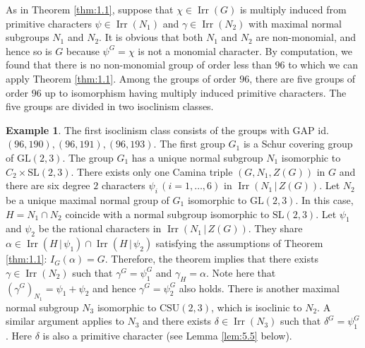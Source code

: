 \documentclass[a4paper,12pt]{article}
\theoremstyle{definition}
\newtheorem{example}[theorem]{Example}
\theoremstyle{remark}
\DeclareMathOperator{\irr}{Irr}
\numberwithin{equation}{section}
\begin{document}
As in Theorem \ref{thm:1.1}, suppose that $\chi \in \irr (G)$ is multiply induced 
from primitive characters  $\psi \in \irr (N_1)$ and $\gamma \in \irr (N_2)$ 
with maximal normal subgroups $N_1$ and $N_2$.
It is obvious that both $N_1$ and $N_2$ are non-monomial, and hence so is $G$
because $\psi^G = \chi $ is not a monomial character.
By computation, we found that there is no non-monomial group of order less than $96$ 
to which we can apply Theorem \ref{thm:1.1}.
Among the groups of order $96$,
there are five groups of order $96$ up to isomorphism having multiply induced 
    primitive characters. The five groups are divided in two isoclinism classes.

\begin{example} \label{ex:5.2}
     The first isoclinism class consists of the groups with GAP id. $(96,190),(96,191),
    (96,193)$. The first group $G_1$ is a Schur covering group of $\mathrm{GL}(2,3)$.
    The group $G_1$ has a unique normal subgroup $N_1$ isomorphic to $C_2 \times \mathrm{SL}(2,3)$.
    There exists only one Camina triple $(G,N_1, Z(G))$ in $G$ and 
    there are six degree $2$ characters $\psi_i \, (i=1,\ldots , 6)$ in $\irr (N_1 \,|\, Z(G))$.
    Let $N_2$ be a unique maximal normal group of $G_1$ isomorphic to $\mathrm{GL}(2,3)$.
    In this case, $H=N_1 \cap N_2$ coincide with a normal subgroup isomorphic to $\mathrm{SL}(2,3)$.
    Let $\psi_1$ and $\psi_2$ be the rational characters in $\irr (N_1 \,|\, Z(G))$.
    They share  $\alpha \in \irr (H \,|\, \psi_1) \cap \irr (H \,|\, \psi_2 )$ satisfying
    the assumptions of Theorem \ref{thm:1.1}: $I_G (\alpha) = G$. Therefore, the theorem 
    implies that there exists 
    $\gamma \in \irr (N_2) $ such that $\gamma^G = \psi_1^G$ and $\gamma_H = \alpha$.
    Note here that $(\gamma^G)_{N_1} = \psi_1 + \psi_2$ and hence $\gamma^G = \psi_2^G$
    also holds.
    There is another maximal normal subgroup $N_3$ isomorphic to $\mathrm{CSU}(2,3)$,
    which is isoclinic to $N_2$. A similar argument applies to $N_3$ and there exists 
    $\delta \in \irr (N_3)$ such that $\delta^G = \psi_1^G$. Here $\delta $ is also 
    a primitive character (see Lemma \ref{lem:5.5} below).
\end{example}
\end{document}
